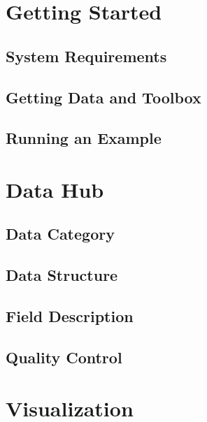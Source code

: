 \documentclass[11pt]{article}
\numberwithin{equation}{section}
\numberwithin{table}{section}
\numberwithin{figure}{section}
\begin{document}
\newpage
\section{Getting Started} \label{sec:start}

\subsection{System Requirements}

\subsection{Getting Data and Toolbox}

\subsection{Running an Example}





\newpage
\section{Data Hub} \label{sec:datahub}

\subsection{Data Category}

\subsection{Data Structure}

\subsection{Field Description}

\subsection{Quality Control}








\newpage
\section{Visualization} \label{sec:visual}
\end{document}
